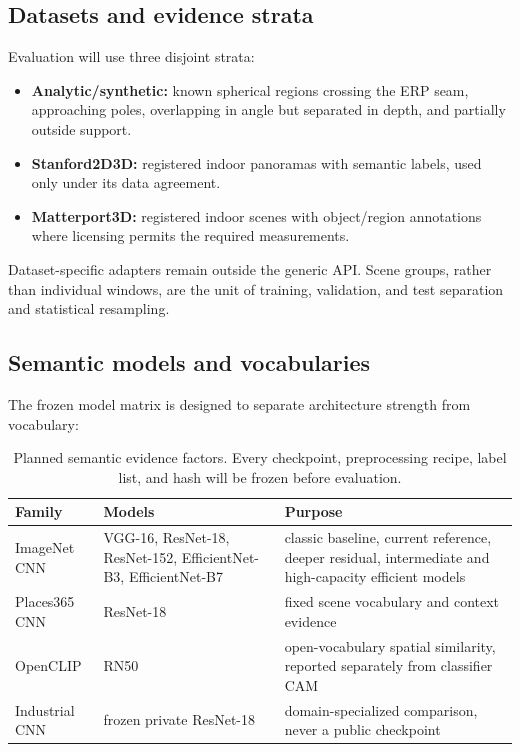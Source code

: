\documentclass[a4paper,9pt]{extarticle}
\begin{document}
\subsection{Datasets and evidence strata}

Evaluation will use three disjoint strata:
\begin{itemize}
 \item \textbf{Analytic/synthetic:} known spherical regions crossing the ERP seam, approaching poles, overlapping in angle but separated in depth, and partially outside support.
 \item \textbf{Stanford2D3D:} registered indoor panoramas with semantic labels, used only under its data agreement.
 \item \textbf{Matterport3D:} registered indoor scenes with object/region annotations where licensing permits the required measurements.
\end{itemize}
Dataset-specific adapters remain outside the generic API. Scene groups, rather than individual windows, are the unit of training, validation, and test separation and statistical resampling.

\subsection{Semantic models and vocabularies}

The frozen model matrix is designed to separate architecture strength from vocabulary:
\begin{table}[H]
\centering
\caption{Planned semantic evidence factors. Every checkpoint, preprocessing recipe, label list, and hash will be frozen before evaluation.}
\label{tab:models}
\begin{tabular}{@{}p{18mm}p{21mm}p{28mm}@{}}
\toprule
Family & Models & Purpose\\
\midrule
ImageNet CNN & VGG-16, ResNet-18, ResNet-152, EfficientNet-B3, EfficientNet-B7 & classic baseline, current reference, deeper residual, intermediate and high-capacity efficient models\\
Places365 CNN & ResNet-18 & fixed scene vocabulary and context evidence\\
OpenCLIP & RN50 & open-vocabulary spatial similarity, reported separately from classifier CAM\\
Industrial CNN & frozen private ResNet-18 & domain-specialized comparison, never a public checkpoint\\
\bottomrule
\end{tabular}
\end{table}
\end{document}
